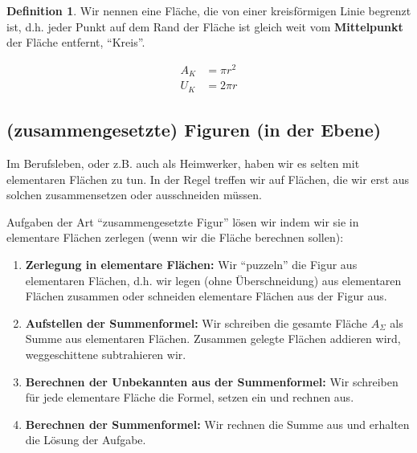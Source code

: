 \documentclass[a4paper]{book}%
\theoremstyle{definition}
\newtheorem{definition}{Definition}
\begin{document}
\begin{definition}
    Wir nennen eine Fläche, die von einer kreisförmigen Linie begrenzt ist, d.h. jeder Punkt auf dem Rand der Fläche ist gleich weit vom \textbf{Mittelpunkt} der Fläche entfernt, \enquote{Kreis}.
\end{definition}

\begin{align}\label{eqn:Kreis}
  A_K &= \pi r^2 \\
  U_K &= 2 \pi r
\end{align}


\subsection{(zusammengesetzte) Figuren (in der Ebene)}

Im Berufsleben, oder z.B. auch als Heimwerker, haben wir es selten mit elementaren Flächen zu tun. In der Regel treffen wir auf Flächen, die wir erst aus solchen zusammensetzen oder ausschneiden müssen.

Aufgaben der Art \enquote{zusammengesetzte Figur} lösen wir indem wir sie in elementare Flächen zerlegen (wenn wir die Fläche berechnen sollen):
\begin{enumerate}
  \item \textbf{Zerlegung in elementare Flächen:} Wir \enquote{puzzeln} die Figur aus elementaren Flächen, d.h. wir legen (ohne Überschneidung) aus elementaren Flächen zusammen oder schneiden elementare Flächen aus der Figur aus.
  \item \textbf{Aufstellen der Summenformel:} Wir schreiben die gesamte Fläche $A_\Sigma$ als Summe aus elementaren Flächen. Zusammen gelegte Flächen addieren wird, weggeschittene subtrahieren wir.
  \item \textbf{Berechnen der Unbekannten aus der Summenformel:} Wir schreiben für jede elementare Fläche die Formel, setzen ein und rechnen aus.
  \item \textbf{Berechnen der Summenformel:} Wir rechnen die Summe aus und erhalten die Lösung der Aufgabe.
\end{enumerate}
\end{document}
